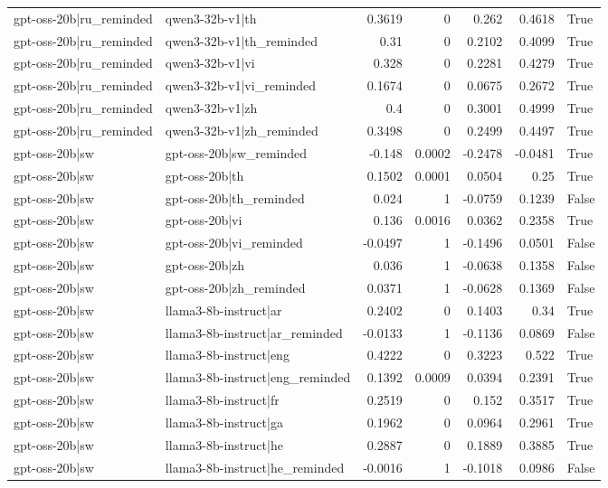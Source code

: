 \begin{table}
\begin{tabular}{l l r r r r l}
gpt-oss-20b|ru_reminded & qwen3-32b-v1|th & 0.3619 & 0 & 0.262 & 0.4618 & True \\
gpt-oss-20b|ru_reminded & qwen3-32b-v1|th_reminded & 0.31 & 0 & 0.2102 & 0.4099 & True \\
gpt-oss-20b|ru_reminded & qwen3-32b-v1|vi & 0.328 & 0 & 0.2281 & 0.4279 & True \\
gpt-oss-20b|ru_reminded & qwen3-32b-v1|vi_reminded & 0.1674 & 0 & 0.0675 & 0.2672 & True \\
gpt-oss-20b|ru_reminded & qwen3-32b-v1|zh & 0.4 & 0 & 0.3001 & 0.4999 & True \\
gpt-oss-20b|ru_reminded & qwen3-32b-v1|zh_reminded & 0.3498 & 0 & 0.2499 & 0.4497 & True \\
gpt-oss-20b|sw & gpt-oss-20b|sw_reminded & -0.148 & 0.0002 & -0.2478 & -0.0481 & True \\
gpt-oss-20b|sw & gpt-oss-20b|th & 0.1502 & 0.0001 & 0.0504 & 0.25 & True \\
gpt-oss-20b|sw & gpt-oss-20b|th_reminded & 0.024 & 1 & -0.0759 & 0.1239 & False \\
gpt-oss-20b|sw & gpt-oss-20b|vi & 0.136 & 0.0016 & 0.0362 & 0.2358 & True \\
gpt-oss-20b|sw & gpt-oss-20b|vi_reminded & -0.0497 & 1 & -0.1496 & 0.0501 & False \\
gpt-oss-20b|sw & gpt-oss-20b|zh & 0.036 & 1 & -0.0638 & 0.1358 & False \\
gpt-oss-20b|sw & gpt-oss-20b|zh_reminded & 0.0371 & 1 & -0.0628 & 0.1369 & False \\
gpt-oss-20b|sw & llama3-8b-instruct|ar & 0.2402 & 0 & 0.1403 & 0.34 & True \\
gpt-oss-20b|sw & llama3-8b-instruct|ar_reminded & -0.0133 & 1 & -0.1136 & 0.0869 & False \\
gpt-oss-20b|sw & llama3-8b-instruct|eng & 0.4222 & 0 & 0.3223 & 0.522 & True \\
gpt-oss-20b|sw & llama3-8b-instruct|eng_reminded & 0.1392 & 0.0009 & 0.0394 & 0.2391 & True \\
gpt-oss-20b|sw & llama3-8b-instruct|fr & 0.2519 & 0 & 0.152 & 0.3517 & True \\
gpt-oss-20b|sw & llama3-8b-instruct|ga & 0.1962 & 0 & 0.0964 & 0.2961 & True \\
gpt-oss-20b|sw & llama3-8b-instruct|he & 0.2887 & 0 & 0.1889 & 0.3885 & True \\
gpt-oss-20b|sw & llama3-8b-instruct|he_reminded & -0.0016 & 1 & -0.1018 & 0.0986 & False \\

\end{tabular}
\end{table}
